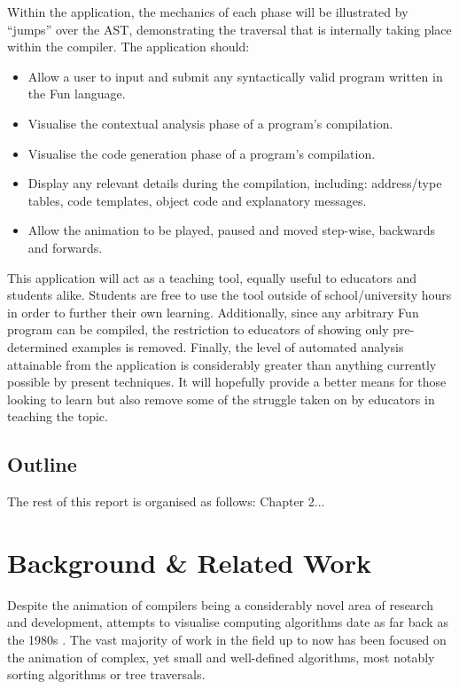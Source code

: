 \documentclass{l4proj}
\begin{document}
Within the application, the mechanics of each phase will be illustrated by ``jumps'' over the AST, demonstrating the traversal that is internally taking place within the compiler. The application should:
\begin{itemize}
\item Allow a user to input and submit any syntactically valid program written in the Fun language.
\item Visualise the contextual analysis phase of a program's compilation. 
\item Visualise the code generation phase of a program's compilation.
\item Display any relevant details during the compilation, including: address/type tables, code templates, object code and explanatory messages.
\item Allow the animation to be played, paused and moved step-wise, backwards and forwards.
\end{itemize}

This application will act as a teaching tool, equally useful to educators and students alike. Students are free to use the tool outside of school/university hours in order to further their own learning. Additionally, since any arbitrary Fun program can be compiled, the restriction to educators of showing only pre-determined examples is removed. Finally, the level of automated analysis attainable from the application is considerably greater than anything currently possible by present techniques. It will hopefully provide a better means for those looking to learn but also remove some of the struggle taken on by educators in teaching the topic.

\section{Outline}
The rest of this report is organised as follows: Chapter 2...

\chapter{Background \& Related Work}
Despite the animation of compilers being a considerably novel area of research and development, attempts to visualise computing algorithms date as far back as the 1980s \cite{BentleyKernighan}. The vast majority of work in the field up to now has been focused on the animation of complex, yet small and well-defined algorithms, most notably sorting algorithms or tree traversals.
\end{document}
